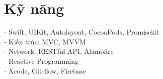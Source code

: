 \documentclass[letterpaper,11pt]{article}
\newcommand{\resumeSubHeadingListStart}{\begin{itemize}[leftmargin=0.15in, label={}]}
\newcommand{\resumeSubHeadingListEnd}{\end{itemize}}
\begin{document}
\section{Kỹ năng}
  \vspace{2pt}
  \resumeSubHeadingListStart
    \small{\item{
        - Swift, UIKit, Autolayout, CocoaPods, Promisekit \\ \vspace{3pt}
        - Kiến trúc: MVC, MVVM \\ \vspace{3pt}
        - Network: RESTful API, Alamofire \\ \vspace{3pt}
        - Reactive Programming \\ \vspace{3pt}
        - Xcode, Git-flow, Firebase \\ \vspace{3pt}
        
        
        
    }}
  \resumeSubHeadingListEnd




        
\end{document}
